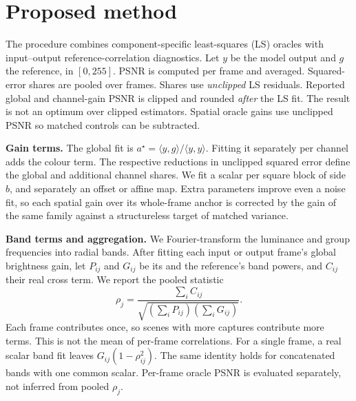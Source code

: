 \section{Proposed method}
\label{sec:method}

The procedure combines component-specific least-squares (LS) oracles with input--output reference-correlation diagnostics. Let $y$ be the model output and $g$
the reference, in $[0,255]$. PSNR is computed per frame and averaged. Squared-error
shares are pooled over frames. Shares use \emph{unclipped} LS residuals. Reported global and channel-gain PSNR is clipped and rounded \emph{after} the LS fit. The result is not an optimum over clipped estimators. Spatial oracle gains use unclipped PSNR so matched controls can be subtracted.

\noindent\textbf{Gain terms.} The global fit is
$a^{\star}=\langle y,g\rangle/\langle y,y\rangle$. Fitting it separately per channel
adds the colour term. The respective reductions in unclipped squared error define the global and additional channel shares. We fit a scalar per square block of side
$b$, and separately an offset or affine map. Extra parameters improve even a noise fit, so each spatial gain over its whole-frame anchor is corrected by the gain of the same family against a structureless target of matched variance.

\noindent\textbf{Band terms and aggregation.} We Fourier-transform the luminance and
group frequencies into radial bands. After fitting each input or output frame's global brightness gain, let $P_{ij}$ and $G_{ij}$ be its and the reference's
band powers, and $C_{ij}$ their real cross term. We report the pooled statistic
\begin{equation}
\rho_j=\frac{\sum_i C_{ij}}{\sqrt{(\sum_i P_{ij})(\sum_i G_{ij})}}.
\label{eq:pooled}
\end{equation}
Each frame contributes once, so scenes with more captures contribute more terms. This is not the mean of per-frame correlations. For a single frame, a real scalar band fit leaves
$G_{ij}(1-\rho_{ij}^{2})$. The same identity holds for concatenated bands with one
common scalar. Per-frame oracle PSNR is evaluated separately, not inferred from
pooled $\rho_j$. 

